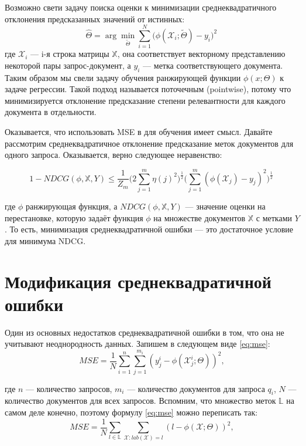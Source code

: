 \documentclass[specialist,
               substylefile = spbu.rtx,
               subf,href,colorlinks=true, 12pt]{disser}
\begin{document}
Возможно свети задачу поиска оценки к минимизации среднеквадратичного отклонения предсказанных значений от истинных: 
\begin{equation*}\hat\Theta = \arg\underset{\tilde\Theta}{\min}\sum_{i=1}^{N}{\Big(\phi(\mathcal X_i; \tilde\Theta) - y_i\Big) ^ 2}\,
\end{equation*} где $\mathcal X_i$ --- i-я строка матрицы $\mathbb X$, она соответствует векторному представлению некоторой пары запрос-документ, а $y_i$ --- метка соответствующего документа. Таким образом мы свели задачу обучения ранжирующей функции $\phi(x; \Theta)$ к задаче регрессии. Такой подход называется поточечным (pointwise), потому что минимизируется отклонение предсказание степени релевантности для каждого документа в отдельности.\par

Оказывается, что использовать MSE в для обучения имеет смысл. Давайте рассмотрим среднеквадратичное отклонение предсказание меток документов для одного запроса. Оказывается, верно следующее неравенство\cite{MSEBound}:
 
\begin{equation*}
1 - NDCG(\phi, \mathbb X, Y) \leq \frac{1}{Z_m}\Big( 2 \sum_{j=1}^{m}{\eta(j)^2}\Big)^{\frac{1}{2}} \Big( \sum_{j=1}^{m}{(\phi(\mathcal X_j) - y_j)^2}\Big)^{\frac{1}{2}}\,
\end{equation*}

где $\phi$ ранжирующая функция, а $NDCG(\phi, \mathbb X, Y)$ --- значение оценки на перестановке, которую задаёт функция $\phi$ на множестве документов $\mathbb X$ с метками $Y$. То есть, минимизация среднеквадратичной ошибки --- это достаточное условие для минимума NDCG.\par

\chapter{Модификация среднеквадратичной ошибки}

Один из основных недостатков среднеквадратичной ошибки в том, что она не учитывают неоднородность данных. Запишем в следующем виде \eqref{eq:mse}:
\begin{equation}
\label{eq:mse}
MSE=\frac{1}{N}\sum_{i =1}^{n}{\sum_{j=1}^{m_i}{(y^i_j - \phi(\mathcal X^i_j; \Theta))^2}},
\end{equation}

где $n$ --- количество запросов, $m_i$ --- количество документов для запроса $q_i$, $N$ --- количество документов для всех запросов. Вспомним, что множество меток $\mathbb L$ на самом деле конечно, поэтому формулу \eqref{eq:mse} можно переписать так:
\begin{equation*}
MSE = \frac{1}{N}\sum_{l \in \mathbb L}{\sum_{\mathcal X : lab(\mathcal X) = l}{(l - \phi(\mathcal X; \Theta))^2}},
\end{equation*}
\end{document}

